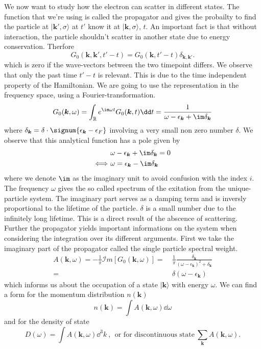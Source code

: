 \documentclass[../main.tex]{subfile}
\begin{document}
We now want to study how the electron can scatter in different states. The function that we're using is called the propagator and
gives the probailty to find the particle at $|\bm{k}',\sigma\rangle$ at $t'$ know it at  $|\bm{k},\sigma\rangle$, $t$. 
An important fact is that without interaction, the particle shouldn't scatter in another state due to energy conservation. Therfore
\[
    G_0(\bm{k}, \bm{k}', t'-t) = G_0(\bm{k}, t'-t) \delta_{\bm{k}, \bm{k}'}.
\]
which is zero if the wave-vectors between the two timepoint differs. 
We observe that only the past time $t'-t$ is relevant. This is due to the time independent property of the Hamiltonian.
We are going to use the representation in the frequency space, using a Fourier-transformation.
\begin{equation}
    G_0(\bm{k},\omega) = \int_{\mathbb{R}} e^{\im\omega t} G_0(\bm{k},t)\dd t = \frac{1}{\omega - \epsilon_{\bm{k}} + \im \delta_{\bm{k}}} \label{eq:single_propa}
\end{equation}
where $\delta_{\bm{k}} = \delta \cdot\signum{\epsilon_{\bm{k}} - \epsilon_{F}}$ involving a very small non zero number $\delta$. We observe that
this analytical function has a pole given by 
\begin{align*}
    &\omega - \epsilon_{\bm{k}} + \im \delta_{\bm{k}} = 0\\
    \Longleftrightarrow ~& \omega = \epsilon_{\bm{k}} - \im \delta_{\bm{k}}
\end{align*}
where we denote $\im$ as the imaginary unit to avoid confusion with the index $i$.
The frequency $\omega$ gives the so called spectrum of the exitation from the unique-particle system. The imaginary part serves as a damping term and is 
inversly proportional to the lifetime of the particle. $\delta$ is a small number due to the infinitely long lifetime. This is a direct result of the abscence
of scattering.\\

Further the propagator yields important informations on the system when considering the integration over its different arguments. First we take the imaginary 
part of the propagator called the single particle spectral weight.
\begin{align*}
    A(\bm{k}, \omega) = -\frac{1}{\pi} \mathcal{I}m \left[G_0(\bm{k}, \omega)\right] =~& \frac{1}{\pi} \frac{\delta_{\bm{k}}}{(\omega- \epsilon_{\bm{k}})^2 + \delta_{\bm{k}}}\\
    =~&\delta(\omega- \epsilon_{\bm{k}})
\end{align*}
which informs us about the occupation of a state $|\bm{k}\rangle$ with energy $\omega$. We can find a form for the momentum distribution $n(\bm{k})$
\[
    n(\bm{k}) = \int A(\bm{k},\omega) \dd \omega
\]
and for the density of state
\[
    D(\omega) = \int A(\bm{k},\omega) \dd ^3 k~,~~ \text{or for discontinuous state}~ \sum_{\bm{k}} A(\bm{k}, \omega).
\]
\end{document}
